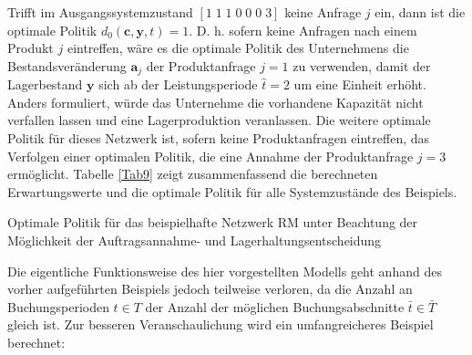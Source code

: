 Trifft im Ausgangssystemzustand $[1\;1\;1\;0\;0\;0\;3]$ keine Anfrage $j$ ein, dann ist die optimale Politik $d_{0}({\textbf{c},\textbf{y}, t})=1$. D. h. sofern keine Anfragen nach einem Produkt $j$ eintreffen, wäre es die optimale Politik des Unternehmens die Bestandsveränderung $\textbf{a}_j$ der Produktanfrage $j=1$ zu verwenden, damit der Lagerbestand $\textbf{y}$ sich ab der Leistungsperiode $\hat{t}=2$ um eine Einheit erhöht. Anders formuliert, würde das Unternehme die vorhandene Kapazität nicht verfallen lassen und eine Lagerproduktion veranlassen. Die weitere optimale Politik für dieses Netzwerk ist, sofern keine Produktanfragen eintreffen, das Verfolgen einer optimalen Politik, die eine Annahme der Produktanfrage $j=3$ ermöglicht. Tabelle \ref{Tab9} zeigt zusammenfassend die berechneten Erwartungswerte und die optimale Politik für alle Systemzustände des Beispiels.

\begin{table}
\begin{footnotesize}
     \caption{Optimale Politik für das beispielhafte Netzwerk RM unter Beachtung der Möglichkeit der Auftragsannahme- und Lagerhaltungsentscheidung} \label{Tab9}
    \vspace*{3mm}
        \begin{center}
      \end{center}
    \begin{center}
      \end{center}
\end{footnotesize}
\end{table}

Die eigentliche Funktionsweise des hier vorgestellten Modells geht anhand des vorher aufgeführten Beispiels jedoch teilweise verloren, da die Anzahl an Buchungsperioden $t\in T$ der Anzahl der möglichen Buchungsabschnitte $\bar{t}\in\bar{T}$ gleich ist. Zur besseren Veranschaulichung wird ein umfangreicheres Beispiel berechnet:

